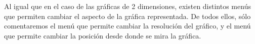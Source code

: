 Al igual que en el caso de las gráficas de 2 dimensiones, existen
distintos menús que permiten cambiar el aspecto de la gráfica
representada. De todos ellos, sólo comentaremos el menú
 que permite cambiar la
resolución del gráfico, y el menú  que permite cambiar la posición desde donde se mira la gráfica.

